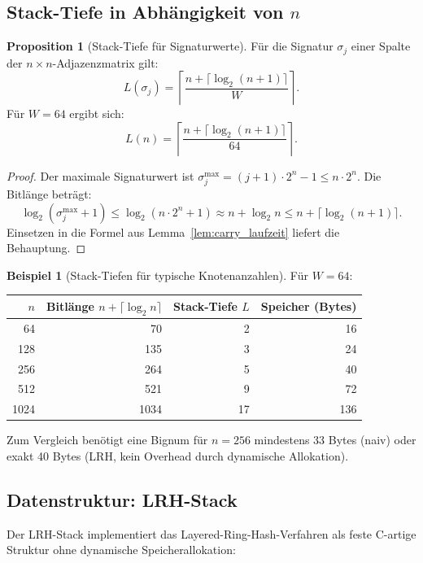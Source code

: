 ﻿\documentclass[a4paper,12pt]{article}
\theoremstyle{definition}
\newtheorem{beispiel}{Beispiel}
\newtheorem{proposition}{Proposition}
\begin{document}
\subsection{Stack-Tiefe in Abhängigkeit von $n$}

\begin{proposition}[Stack-Tiefe für Signaturwerte]
\label{prop:stacktiefe}
Für die Signatur $\sigma_j$ einer Spalte der $n \times n$-Adjazenzmatrix gilt:
\[
  L(\sigma_j) = \left\lceil \frac{n + \lceil \log_2(n+1) \rceil}{W} \right\rceil.
\]
Für $W = 64$ ergibt sich:
\[
  L(n) = \left\lceil \frac{n + \lceil \log_2(n+1) \rceil}{64} \right\rceil.
\]
\end{proposition}

\begin{proof}
Der maximale Signaturwert ist $\sigma_j^{\max} = (j+1) \cdot 2^n - 1 \leq n \cdot 2^n$.
Die Bitlänge beträgt:
\[
  \log_2(\sigma_j^{\max} + 1) \leq \log_2(n \cdot 2^n + 1)
  \approx n + \log_2 n \leq n + \lceil \log_2(n+1) \rceil.
\]
Einsetzen in die Formel aus Lemma~\ref{lem:carry_laufzeit} liefert die Behauptung.
\end{proof}

\begin{beispiel}[Stack-Tiefen für typische Knotenanzahlen]
\label{bsp:stacktiefe}
Für $W = 64$:
\begin{center}
\begin{tabular}{rrrr}
\toprule
$n$ & Bitlänge $n + \lceil\log_2 n\rceil$ & Stack-Tiefe $L$ & Speicher (Bytes) \\
\midrule
 64 &  70 & 2 & 16 \\
128 & 135 & 3 & 24 \\
256 & 264 & 5 & 40 \\
512 & 521 & 9 & 72 \\
1024 & 1034 & 17 & 136 \\
\bottomrule
\end{tabular}
\end{center}
Zum Vergleich benötigt eine Bignum für $n=256$ mindestens 33 Bytes (naiv)
oder exakt 40 Bytes (LRH, kein Overhead durch dynamische Allokation).
\end{beispiel}

\subsection{Datenstruktur: LRH-Stack}

Der LRH-Stack implementiert das Layered-Ring-Hash-Verfahren als feste C-artige Struktur
ohne dynamische Speicherallokation:
\end{document}
